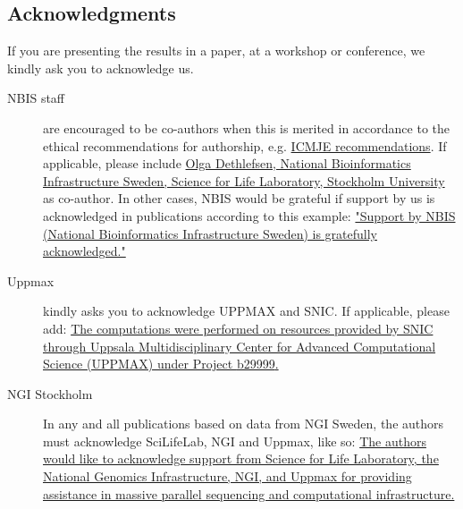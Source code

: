 \documentclass[12pt]{article}
\newcommand{\staff}{Olga Dethlefsen}
\newcommand{\staffWeb}{http://nbis.se/about/staff/olga-dethlefsen/}
\newcommand{\affilations}{National Bioinformatics Infrastructure Sweden, Science for Life Laboratory, Stockholm University}
\newcommand{\uppmaxWeb}{http://www.uppmax.uu.se/support/faq/general-miscellaneous-faq/acknowledging-uppmax--snic--and-uppnex/}
\newcommand{\noUppmax}{b29999}
\begin{document}
\subsection{Acknowledgments}
\label{acknowledgments}
If you are presenting the results in a paper, at a workshop or conference, we kindly ask you to acknowledge us.
\begin{description}
\item[NBIS staff] are encouraged to be co-authors when this is merited in accordance to the ethical recommendations for authorship, e.g. {\href{http://www.icmje.org/recommendations/browse/roles-and-responsibilities/defining-the-role-of-authors-and-contributors.html}{ICMJE recommendations}}. If applicable, please include {\href{\staffWeb}{{\staff}, \affilations}} as co-author. In other cases, NBIS would be grateful if support by us is acknowledged in publications according to this example: \href{https://bils.se/resources/support.html}{"Support by NBIS (National Bioinformatics Infrastructure Sweden) is gratefully acknowledged."}
\item[Uppmax] kindly asks you to acknowledge UPPMAX and SNIC. If applicable, please add: {\href{\uppmaxWeb}{The computations were performed on resources provided by SNIC through Uppsala Multidisciplinary Center for Advanced Computational Science (UPPMAX) under Project {\noUppmax}.}}
\item[NGI Stockholm] In any and all publications based on data from NGI Sweden, the authors must acknowledge SciLifeLab, NGI and Uppmax, like so: \href{https://ngisweden.scilifelab.se/info/faq#how-do-i-acknowledge-ngi-in-my-publication}{The authors would like to acknowledge support from Science for Life Laboratory, the National Genomics Infrastructure, NGI, and Uppmax for providing assistance in massive parallel sequencing and computational infrastructure.}
\end{description}
\end{document}
